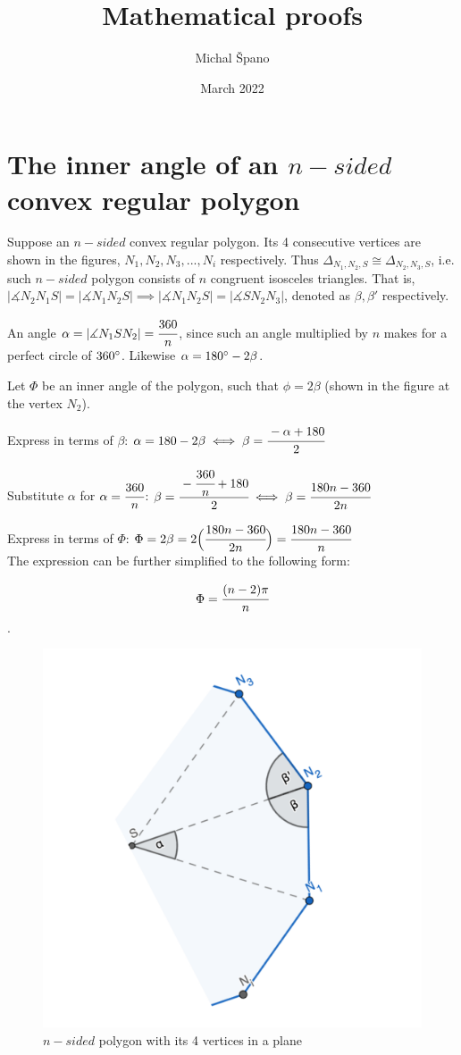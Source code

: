 \documentclass[10pt,a4paper]{article}
\title{\textbf{Mathematical proofs}}
\author{Michal Špano}
\date{March 2022}
\begin{document}
\maketitle

\section{The inner angle of an $n-sided$ convex regular polygon}

Suppose an $n-sided$ convex regular polygon. Its 4 consecutive vertices are shown in the figures, $N_1, N_2, N_3, ..., N_i$ respectively. 
Thus $\Delta_{N_1,N_2,S} \cong \Delta_{N_2,N_3,S}$, i.e. such $n-sided$ polygon consists of $n$ congruent isosceles triangles. 
That is, $|\measuredangle N_2 N_1 S| = |\measuredangle N_1 N_2 S| \implies |\measuredangle N_1 N_2 S| = |\measuredangle S N_2 N_3|$, denoted as $\beta, \beta'$ respectively. 

An angle $\alpha = |\measuredangle N_1 S N_2| = \cfrac{360}{n}$, since such an angle multiplied by $n$ makes for a perfect circle of $360\degree$. Likewise $\alpha = 180\degree - 2 \beta$.

Let $\Phi$ be an inner angle of the polygon, such that $\phi = 2 \beta$ (shown in the figure at the vertex $N_2$).

Express in terms of $\beta$: $\alpha = 180 - 2 \beta \iff \beta = \cfrac{-\alpha + 180}{2}$

Substitute $\alpha$ for $\alpha = \cfrac{360}{n}$: $\beta = \cfrac{-\cfrac{360}{n} + 180}{2} \iff \beta = \cfrac{180n - 360}{2n}$

Express in terms of $\Phi$: $\Phi = 2 \beta = 2 \Big( \cfrac{180n - 360}{2n} \Big) = \cfrac{180n - 360}{n}$ \\

The expression can be further simplified to the following form:

$$\Phi = \cfrac{(n-2) \pi}{n}$$.


\begin{figure}[htp]
    \centering
    \includegraphics[width=4.cm]{polygon_export.png}
    \caption{$n-sided$ polygon with its 4 vertices in a plane}
\end{figure}
\end{document}
